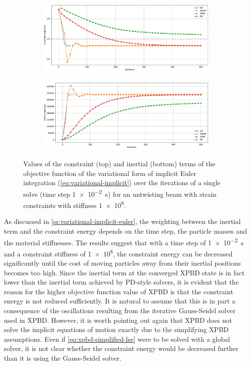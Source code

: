 \begin{figure}[h]
    \centering
    \begin{subfigure}{\textwidth}
        \includegraphics[width=\linewidth]{figures/strain_beam_untwist_constraintObjectives.pdf}
    \end{subfigure}
    \begin{subfigure}{\textwidth}
        \includegraphics[width=\linewidth]{figures/strain_beam_untwist_inertialObjectives.pdf}
    \end{subfigure}
    \caption{Values of the constraint (top) and inertial (bottom) terms of the objective function of the variational form of implicit Euler integration 
        (\cref{eq:variational-implicit}) over the iterations of a single solve (time step \SI{1e-2}{\second}) for an untwisting beam with strain 
    constraints with stiffness \num{1e8}.}
    \label{fig:strain-beam-untwist-objectives-split}
\end{figure}

As discussed in \autoref{ss:variational-implicit-euler}, the weighting between the inertial term and the constraint energy depends on the time step, the particle masses 
and the material stiffnesses. The results suggest that with a time step of \SI{1e-2}{\second} and a constraint stiffness of \num{1e8}, the constraint energy can be 
decreased significantly until the cost of moving particles away from their inertial positions becomes too high. Since the inertial term at the converged XPBD state 
is in fact lower than the inertial term achieved by PD-style solvers, it is evident that the reason for the 
higher objective function value of XPBD is that the constraint energy is not reduced sufficiently. It is natural to assume that this 
is in part a consequence of the oscillations resulting from the iterative Gauss-Seidel solver used in XPBD. However, it is worth pointing out again that XPBD does not 
solve the implicit equations of motion exactly due to the simplifying XPBD assumptions. Even if \autoref{eq:xpbd-simplified-lse} were to be solved with a global solver,
it is not clear whether the constraint energy would be decreased further than it is using the Gauss-Seidel solver. 

